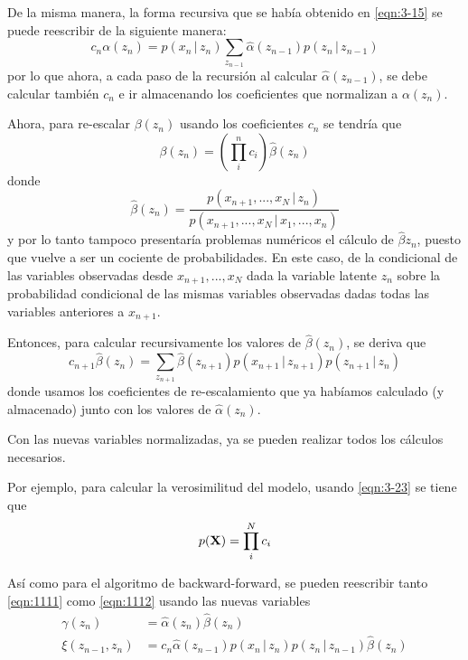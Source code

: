 De la misma manera, la forma recursiva que se había obtenido en \eqref{eqn:3-15} se puede reescribir de la siguiente manera:
\begin{equation}
  c_n \alpha(z_n) = p(x_n \,|\, z_n) \sum_{z_{n-1}} 
    \hat \alpha(z_{n-1}) p(z_n \,|\, z_{n-1})
    \label{eqn:3-25}
\end{equation}
por lo que ahora, a cada paso de la recursión al calcular $\hat \alpha(z_{n-1})$, se debe calcular también $c_n$ e ir almacenando los coeficientes que normalizan a $\alpha(z_n)$.

Ahora, para re-escalar $\beta(z_n)$ usando los coeficientes $c_n$ se tendría que
\begin{equation}
  \beta(z_n) = \left( \prod_i^n c_i \right) \hat \beta(z_n)
  \label{eqn:3-26}
\end{equation}
donde 
\begin{equation}
  \hat \beta(z_n) = 
    \frac{p(x_{n+1}, ..., x_N \,|\, z_n)}
    {p(x_{n+1}, ..., x_N \,|\, x_1, ..., x_n)}
  \label{eqn:3-27}
\end{equation}
y por lo tanto tampoco presentaría problemas numéricos el cálculo de $\hat \beta{z_n}$, puesto que vuelve a ser un cociente de probabilidades. En este caso, de la condicional de las variables observadas desde $x_{n+1}, ..., x_N$ dada la variable latente $z_n$ sobre la probabilidad condicional de las mismas variables observadas dadas todas las variables anteriores a $x_{n+1}$.

Entonces, para calcular recursivamente los valores de $\hat \beta(z_n)$, se deriva que 
\begin{equation}
  c_{n+1} \hat \beta(z_n) = \sum_{z_{n+1}} \hat \beta(z_{n+1})
    p(x_{n+1} \,|\, z_{n+1}) p(z_{n+1} \,|\, z_n)    
  \label{eqn:3-28}
\end{equation}
donde usamos los coeficientes de re-escalamiento que ya habíamos calculado (y almacenado) junto con los valores de $\hat \alpha(z_n)$.

Con las nuevas variables normalizadas, ya se pueden realizar todos los cálculos necesarios. 

Por ejemplo, para calcular la verosimilitud del modelo, usando \eqref{eqn:3-23} se tiene que
\begin{equation}
  p(\textbf{X}) =  \prod_i^N c_i
\end{equation}

Así como para el algoritmo de backward-forward, se pueden reescribir tanto \eqref{eqn:1111} como \eqref{eqn:1112} usando las nuevas variables 
\begin{align}
  \gamma(z_n) &= \hat \alpha(z_n) \hat \beta(z_n) \\
  \xi(z_{n-1}, z_n) &= c_n \hat \alpha(z_{n-1}) p(x_n \,|\, z_n) 
      p(z_n \,|\, z_{n-1}) \hat \beta(z_n) 
\end{align}

